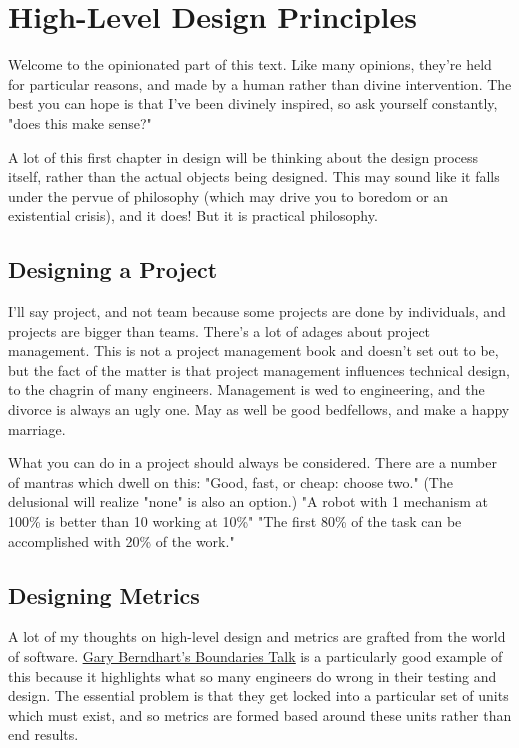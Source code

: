 \chapter{High-Level Design Principles}

Welcome to the opinionated part of this text. Like many opinions, they're held for particular reasons, and made by a human rather than divine intervention. The best you can hope is that I've been divinely inspired, so ask yourself constantly, "does this make sense?"

A lot of this first chapter in design will be thinking about the design process itself, rather than the actual objects being designed. This may sound like it falls under the pervue of philosophy (which may drive you to boredom or an existential crisis), and it does! But it is practical philosophy.

\section{Designing a Project}

I'll say project, and not team because some projects are done by individuals, and projects are bigger than teams. There's a lot of adages about project management. This is not a project management book and doesn't set out to be, but the fact of the matter is that project management influences technical design, to the chagrin of many engineers. Management is wed to engineering, and the divorce is always an ugly one. May as well be good bedfellows, and make a happy marriage.

What you can do in a project should always be considered. There are a number of mantras which dwell on this:
"Good, fast, or cheap: choose two." (The delusional will realize "none" is also an option.)
"A robot with 1 mechanism at 100\% is better than 10 working at 10\%"
"The first 80\% of the task can be accomplished with 20\% of the work."

\section{Designing Metrics}

A lot of my thoughts on high-level design and metrics are grafted from the world of software. \href{https://www.destroyallsoftware.com/talks/boundaries}{\color{red}\underline{Gary Berndhart's Boundaries Talk}} is a particularly good example of this because it highlights what so many engineers do wrong in their testing and design. The essential problem is that they get locked into a particular set of units which must exist, and so metrics are formed based around these units rather than end results.

